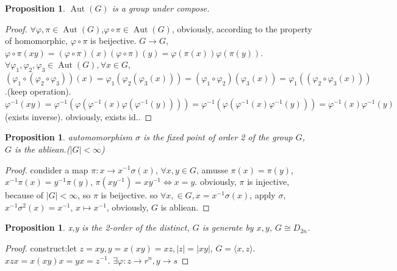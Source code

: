 \documentclass[10pt,a4paper]{article}
\newtheorem{proposition}[theorem]{Proposition}
\begin{document}
\begin{proposition}
    $\operatorname{Aut}(G)$ is a group under compose.
\end{proposition}
\begin{proof}
    $\forall\varphi,\pi\in\operatorname{Aut}(G)$,$\varphi\circ\pi\in\operatorname{Aut}(G)$, obviously, according to the property of homomorphic, $\varphi\circ\pi$ is beijective.
    $G\to G$, $\varphi\circ\pi(xy)=(\varphi\circ\pi)(x)(\varphi\circ\pi)(y)=\varphi(\pi(x))\varphi(\pi(y))$.
    $\forall\varphi_1,\varphi_2,\varphi_3\in\operatorname{Aut}(G),\forall x\in G$, $(\varphi_1\circ(\varphi_2\circ\varphi_3))(x)=\varphi_1(\varphi_2(\varphi_3(x)))=(\varphi_1\circ\varphi_2)(\varphi_3(x))=\varphi_1((\varphi_2\circ\varphi_3(x)))$.(keep operation).
    $\varphi^{-1}(xy)=\varphi^{-1}(\varphi(\varphi^{-1}(x)\varphi(\varphi^{-1}(y))))=\varphi^{-1}(\varphi(\varphi^{-1}(x)\varphi^{-1}(y)))=\varphi^{-1}(x)\varphi^{-1}(y)$(exists inverse). obviously, exists $\mathrm{id.}$.
\end{proof}
\begin{proposition}
    automomorphism $\sigma$ is the fixed point of order 2 of the group $G$, $G$ is the abliean.($|G|<\infty$)
\end{proposition}
\begin{proof}
    condider a map $\pi:x\to x^{-1}\sigma(x)$, $\forall x,y\in G$, amusse $\pi(x)=\pi(y)$, 
    $x^{-1}\pi(x)=y^{-1}\pi(y)$, $\pi(xy^{-1})=xy^{-1}\iff x=y$. obviously, $\pi$ is injective, 
    because of $|G|<\infty$, so $\pi$ is beijective. so $\forall x,\in G, x=x^{-1}\sigma(x)$, apply $\sigma$, $x^{-1}\sigma^{2}(x)=x^{-1}$, $x\mapsto x^{-1}$, obviously, $G$ is abliean.
\end{proof}
\begin{proposition}
    x,y is the 2-order of the distinct, $G$ is generate by $x,y$, $G\cong D_{2n}$.
\end{proposition}
\begin{proof}
    construct:let $z=xy,y=x(xy)=xz, |z|=|xy|$, $G=\langle x,z\rangle$. $xzx=x(xy)x=yx=z^{-1}$.
    $\exists\varphi:z\to r^n,y\to s$
\end{proof}
\end{document}
